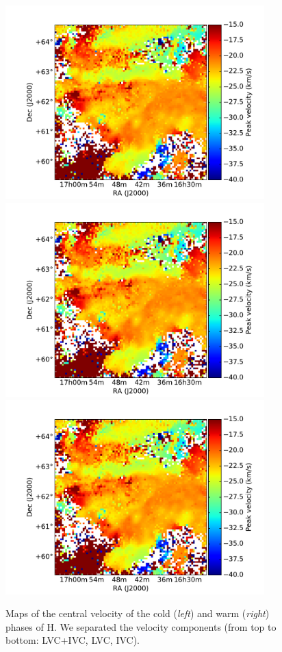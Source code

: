\documentclass[traditabstract]{aa}
\begin{document}
\begin{figure}[h]
  \hspace{5mm}
  \includegraphics[page=5,height=7.5cm,trim=110 35 105 75,clip=true]{Figures/GHIGLS_velo.pdf} \\
  \vspace{5mm}
  \includegraphics[page=3,height=7.5cm,trim=110 35 105 75,clip=true]{Figures/GHIGLS_velo.pdf}
  \hspace{5mm}
  \includegraphics[page=6,height=7.5cm,trim=110 35 105 75,clip=true]{Figures/GHIGLS_velo.pdf}
  \caption{Maps of the central velocity of the cold (\emph{left}) and warm (\emph{right}) phases of H. We separated the velocity components (from top to bottom: LVC+IVC, LVC, IVC).}
\end{figure}
\end{document}
